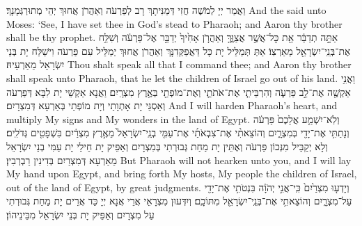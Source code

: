{וַאֲמַר יְיָ לְמֹשֶׁה חֲזִי דְּמַנִּיתָךְ רָב לְפַרְעֹה וְאַהֲרֹן אֲחוּךְ יְהֵי מְתוּרְגְּמָנָךְ׃}
{And the \lord\space said unto Moses: ‘See, I have set thee in God’s stead to Pharaoh; and Aaron thy brother shall be thy prophet.}{}
{אַתָּ֣ה תְדַבֵּ֔ר אֵ֖ת כׇּל־אֲשֶׁ֣ר אֲצַוֶּ֑ךָּ וְאַהֲרֹ֤ן אָחִ֙יךָ֙ יְדַבֵּ֣ר אֶל־פַּרְעֹ֔ה וְשִׁלַּ֥ח אֶת־בְּנֵֽי־יִשְׂרָאֵ֖ל מֵאַרְצֽוֹ׃
}
{אַתְּ תְּמַלֵּיל יָת כָּל דַּאֲפַקְּדִנָּךְ וְאַהֲרֹן אֲחוּךְ יְמַלֵּיל עִם פַּרְעֹה וִישַׁלַּח יָת בְּנֵי יִשְׂרָאֵל מֵאַרְעֵיהּ׃}
{Thou shalt speak all that I command thee; and Aaron thy brother shall speak unto Pharaoh, that he let the children of Israel go out of his land.}{}
{וַאֲנִ֥י אַקְשֶׁ֖ה אֶת־לֵ֣ב פַּרְעֹ֑ה וְהִרְבֵּיתִ֧י אֶת־אֹתֹתַ֛י וְאֶת־מוֹפְתַ֖י בְּאֶ֥רֶץ מִצְרָֽיִם׃
}
{וַאֲנָא אַקְשֵׁי יָת לִבָּא דְּפַרְעֹה וְאַסְגֵּי יָת אָתְוָתַי וְיָת מוֹפְתַי בְּאַרְעָא דְּמִצְרָיִם׃}
{And I will harden Pharaoh’s heart, and multiply My signs and My wonders in the land of Egypt.}{}
{וְלֹֽא־יִשְׁמַ֤ע אֲלֵכֶם֙ פַּרְעֹ֔ה וְנָתַתִּ֥י אֶת־יָדִ֖י בְּמִצְרָ֑יִם וְהוֹצֵאתִ֨י אֶת־צִבְאֹתַ֜י אֶת־עַמִּ֤י בְנֵֽי־יִשְׂרָאֵל֙ מֵאֶ֣רֶץ מִצְרַ֔יִם בִּשְׁפָטִ֖ים גְּדֹלִֽים׃
}
{וְלָא יְקַבֵּיל מִנְּכוֹן פַּרְעֹה וְאֶתֵּין יָת מַחַת גְּבוּרְתִי בְּמִצְרָיִם וְאַפֵּיק יָת חֵילַי יָת עַמִּי בְנֵי יִשְׂרָאֵל מֵאַרְעָא דְּמִצְרַיִם בְּדִינִין רַבְרְבִין׃}
{But Pharaoh will not hearken unto you, and I will lay My hand upon Egypt, and bring forth My hosts, My people the children of Israel, out of the land of Egypt, by great judgments.}{}
{וְיָדְע֤וּ מִצְרַ֙יִם֙ כִּֽי־אֲנִ֣י יְהֹוָ֔ה בִּנְטֹתִ֥י אֶת־יָדִ֖י עַל־מִצְרָ֑יִם וְהוֹצֵאתִ֥י אֶת־בְּנֵֽי־יִשְׂרָאֵ֖ל מִתּוֹכָֽם׃}
{וְיִדְּעוּן מִצְרָאֵי אֲרֵי אֲנָא יְיָ כַּד אֲרֵים יָת מַחַת גְּבוּרְתִי עַל מִצְרָיִם וְאַפֵּיק יָת בְּנֵי יִשְׂרָאֵל מִבֵּינֵיהוֹן׃}
